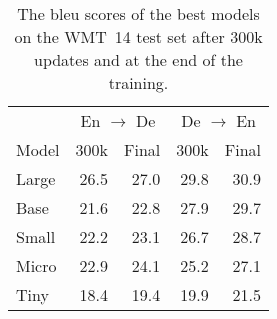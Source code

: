 \begin{table}
  \centering

  \begin{tabular}{lrrrr}
    \toprule
    & \multicolumn{2}{c}{En $\rightarrow$ De}
    & \multicolumn{2}{c}{De $\rightarrow$ En} \\
    Model
    & 300k & Final & 300k & Final \\
    \midrule

    Large & 26.5 & 27.0 & 29.8 & 30.9 \\
    Base & 21.6 & 22.8 & 27.9 & 29.7 \\
    Small & 22.2 & 23.1 & 26.7 & 28.7 \\
    Micro & 22.9 & 24.1 & 25.2 & 27.1 \\
    Tiny & 18.4 & 19.4 & 19.9 & 21.5 \\
    \bottomrule
  \end{tabular}

  \caption{The \acs{bleu} scores of the best models on the WMT~14 test set
    after 300k updates and at the end of the training.}
  \label{tab:wmt14-bleu-scores}
\end{table}

